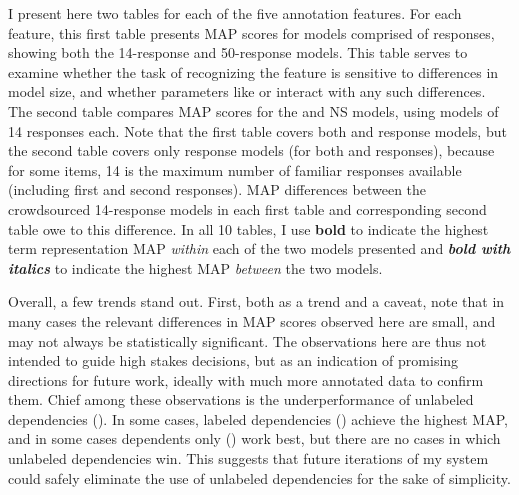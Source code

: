I present here two tables for each of the five annotation features. For each feature, this first table presents MAP scores for models comprised of  responses, showing both the 14-response and 50-response models. This table serves to examine whether the task of recognizing the feature is sensitive to differences in model size, and whether parameters like  or  interact with any such differences. The second table compares MAP scores for the  and  NS models, using models of 14 responses each. Note that the first table covers both  and  response models, but the second table covers only  response models (for both  and  responses), because for some items, 14 is the maximum number of familiar responses available (including first and second responses). MAP differences between the crowdsourced 14-response models in each first table and corresponding second table owe to this difference. In all 10 tables, I use \textbf{bold} to indicate the highest term representation MAP \textit{within} each of the two models presented and \textit{\textbf{bold with italics}} to indicate the highest MAP \textit{between} the two models.

Overall, a few trends stand out. First, both as a trend and a caveat, note that in many cases the relevant differences in MAP scores observed here are small, and may not always be statistically significant.
The observations here are thus not intended to guide high stakes decisions, but as an indication of promising directions for future work, ideally with much more annotated data to confirm them.  Chief among these observations is the underperformance of unlabeled dependencies (). In some cases, labeled dependencies () achieve the highest MAP, and in some cases dependents only () work best, but there are no cases in which unlabeled dependencies win. This suggests that future iterations of my system could safely eliminate the use of unlabeled dependencies for the sake of simplicity.

